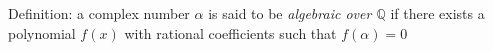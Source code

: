 \documentclass[preview]{standalone}
\begin{document}
\begin{center}
Definition: a complex number $\alpha$ is said to be \textit{algebraic over $\mathbb{Q}$} if there exists a polynomial $f(x)$ with rational coefficients such that $f(\alpha) = 0$
\end{center}
\end{document}
